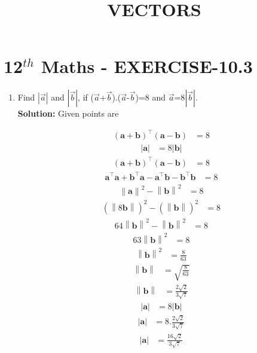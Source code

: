 \documentclass[10pt]{article}
\newcommand{\solution}{\noindent \textbf{Solution: }}
\providecommand{\norm}[1]{\left\lVert#1\right\rVert}
\providecommand{\abs}[1]{\left\vert#1\right\vert}
\let\vec\mathbf{}
\begin{document}
\begin{center}
\title{\textbf{VECTORS}}
\date{\vspace{-5ex}} %
\maketitle
\end{center}

\section{12$^{th}$ Maths - EXERCISE-10.3}

\begin{enumerate}
\item Find $\abs{\overrightarrow{a}}$ and $\abs{\overrightarrow{b}}$, if ($\overrightarrow{a}$+$\overrightarrow{b}$)$.$($\overrightarrow{a}$-$\overrightarrow{b}$)=8 and ${\overrightarrow{a}}$=8$\abs{\overrightarrow{b}}$.\\  

\solution
Given  points are

\begin{align}
(\vec{a}+\vec{b})^{\top}(\vec{a}-\vec{b})&=8
\end{align}
\begin{align}
\abs{\vec{a}}&=8\abs{\vec{b}}
\end{align}
\begin{align}
(\vec{a}+\vec{b})^{\top}(\vec{a}-\vec{b})&=8
\end{align}
\begin{align}
\vec{a}^{\top}\vec{a}+\vec{b}^{\top}\vec{a}-\vec{a}^{\top}\vec{b}-\vec{b}^{\top}\vec{b}&=8
\end{align}
\begin{align}
\norm{\vec{a}}^2-\norm{\vec{b}}^2&=8
\end{align}
\begin{align}
(\norm{8\vec{b}})^2-(\norm{\vec{b}})^2&=8
\end{align}
\begin{align}
64{\norm{\vec{b}}}^2-\norm{\vec{b}}^2&=8
\end{align}
\begin{align}
63{\norm{\vec{b}}}^2&=8
\end{align}
\begin{align}
\norm{\vec{b}}^2&=\frac{8}{63}
\end{align}
\begin{align}
\norm{\vec{b}}&=\sqrt{\frac{8}{63}}
\end{align}
\begin{align}
\norm{\vec{b}}&=\frac{2\sqrt{2}}{3\sqrt{7}}
\end{align}
\begin{align}
\abs{\vec{a}}&=8\abs{\vec{b}}
\end{align}
\begin{align}
\abs{\vec{a}}&=8.\frac{2\sqrt{2}}{3\sqrt{7}}
\end{align}
\begin{align}
\abs{\vec{a}}&=\frac{16\sqrt{2}}{3\sqrt{7}}
\end{align}
\end{enumerate}
\end{document}
